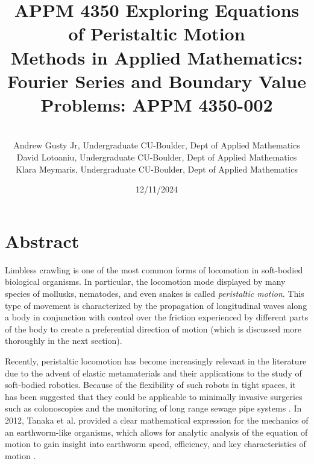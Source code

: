 \documentclass{article}
\title{%
  APPM 4350 Exploring Equations of Peristaltic Motion \\
  \large Methods in Applied Mathematics: Fourier Series and Boundary Value Problems: APPM 4350-002}
\author{\\Andrew Gusty Jr, Undergraduate CU-Boulder, Dept of Applied Mathematics\\David Lotoaniu, Undergraduate CU-Boulder, Dept of Applied Mathematics\\Klara Meymaris, Undergraduate CU-Boulder, Dept of Applied Mathematics}
\date{12/11/2024}
\begin{document}
\maketitle

\section{Abstract}
\par Limbless crawling is one of the most common forms of locomotion  in soft-bodied biological organisms. In particular, the locomotion mode displayed by many species of mollusks, nematodes, and even snakes is called \textit{peristaltic motion}. This type of movement is characterized by the propagation of longitudinal waves along a body in conjunction with control over the friction experienced by different parts of the body to create a preferential direction of motion (which is discussed more thoroughly in the next section).
\par Recently, peristaltic locomotion has become increasingly relevant in the literature due to the advent of elastic metamaterials and their applications to the study of soft-bodied robotics. Because of the flexibility of such robots in tight spaces, it has been suggested that they could be applicable to minimally invasive surgeries such as colonoscopies \cite{Pipes} and the monitoring of long range sewage pipe systems \cite{Medicine}. In 2012, Tanaka et al. provided a clear mathematical expression for the mechanics of an earthworm-like organisms, which allows for analytic analysis of the equation of motion to gain insight into earthworm speed, efficiency, and key characteristics of motion \cite{Tanaka}.
\end{document}
